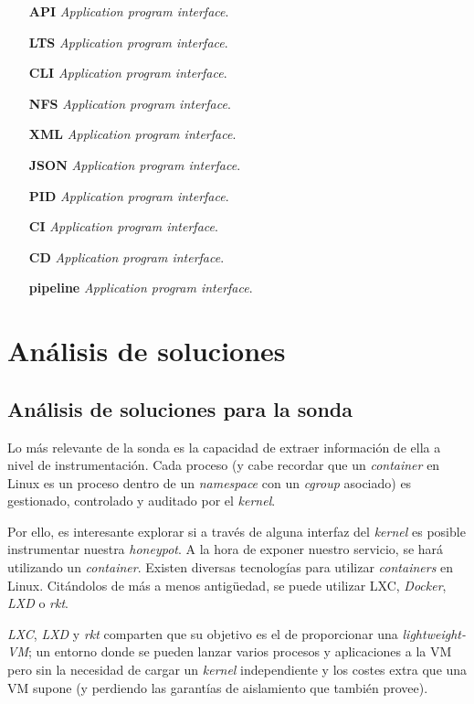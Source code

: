 \begin{itemize}
    \item[\textbf{API}] \emph{Application program interface}.
    \item[\textbf{LTS}] \emph{Application program interface}.
    \item[\textbf{CLI}] \emph{Application program interface}.
    \item[\textbf{NFS}] \emph{Application program interface}.
    \item[\textbf{XML}] \emph{Application program interface}.
    \item[\textbf{JSON}] \emph{Application program interface}.
    \item[\textbf{PID}] \emph{Application program interface}.
    \item[\textbf{CI}] \emph{Application program interface}.
    \item[\textbf{CD}] \emph{Application program interface}.
    \item[\textbf{pipeline}] \emph{Application program interface}.
    
    
    
\end{itemize}

\chapter{Análisis de soluciones}
\label{chapter:analisis-de-soluciones}
\minitoc{}


\section{Análisis de soluciones para la sonda}
\label{sec:analisis-sonda}


Lo más relevante de la sonda es la capacidad de extraer información de ella a nivel de instrumentación. Cada proceso (y cabe recordar que un \emph{container} en Linux es un proceso dentro de un \emph{namespace} con un \emph{cgroup} asociado) es gestionado, controlado
y auditado por el \emph{kernel}.

Por ello, es interesante explorar si a través de alguna interfaz del \emph{kernel} es posible instrumentar nuestra \emph{honeypot}. A la hora de exponer nuestro servicio, se hará utilizando
un \emph{container}. Existen diversas tecnologías para utilizar \emph{containers} en Linux. Citándolos de más a menos antigüedad, se puede utilizar LXC, \emph{Docker}, \emph{LXD} o \emph{rkt}.

\emph{LXC}, \emph{LXD} y \emph{rkt} comparten que su objetivo es el de proporcionar una \emph{lightweight-VM}; un entorno donde se pueden lanzar varios procesos y aplicaciones a la VM
pero sin la necesidad de cargar un \emph{kernel} independiente y los costes extra que una VM supone (y perdiendo las garantías de aislamiento que también provee).

